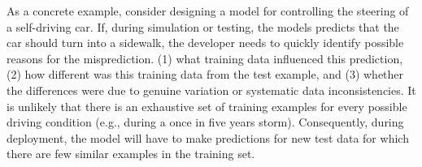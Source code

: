 
As a concrete example, consider designing a model for controlling the steering of a self-driving car.
If, during simulation or testing, the models predicts that the car should turn into a sidewalk, the developer needs to quickly identify possible reasons for the misprediction.
(1) what training data influenced this prediction, (2) how different was this training data from the test example, and (3) whether the differences were due to genuine variation or systematic data inconsistencies.  
It is unlikely that there is an exhaustive set of training examples for every possible driving condition (e.g., during a once in five years storm).
Consequently, during deployment, the model will have to make predictions for new test data for which there are few similar examples in the training set.

